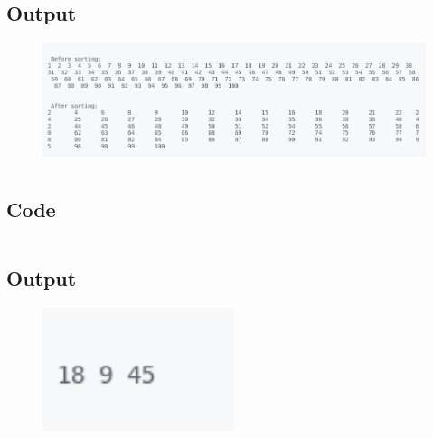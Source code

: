 \documentclass[12pt]{article}
\begin{document}
\subsection{Output}
\begin{figure}[h]
    \centering
    \includegraphics[width=1.05\textwidth]{8.png}
\end{figure}
\newpage
\section{}
\subsection{Code}
\inputminted{c}{q9.c}
\subsection{Output}
\begin{figure}[h]
    \centering
    \includegraphics[width=0.5\textwidth]{9.png}
\end{figure}
\end{document}
